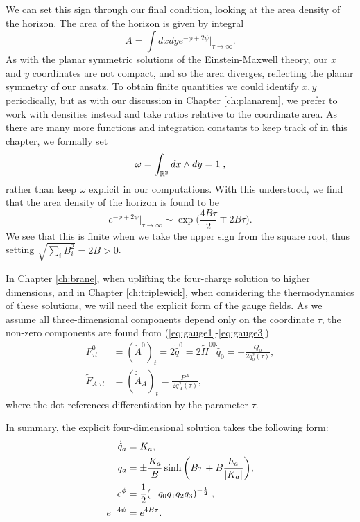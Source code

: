We can set this sign through our final condition, looking at the area density of the horizon. The area of the horizon is given by integral
\begin{equation}
A = \int dx dy e^{-\phi+2\psi}\bigg|_{\tau \rightarrow \infty}.
\end{equation}
As with the planar symmetric solutions of the Einstein-Maxwell theory, our $x$ and $y$ coordinates are not compact, and so the area diverges, reflecting the planar symmetry of our ansatz. To obtain finite quantities we could identify $x,y$ periodically, but as with our discussion in Chapter \ref{ch:planarem}, we prefer to work with densities instead and take ratios relative to the coordinate area. As there are many more functions and integration constants to keep track of in this chapter, we formally set
\begin{equation*}
	\omega = \int_{{\mathbb{R}}^2} dx \wedge dy = 1 \;,
\end{equation*}
rather than keep $\omega$ explicit in our computations. With this understood, we find that the area density of the horizon is found to be
\begin{equation}
e^{-\phi + 2\psi} \bigg|_{\tau \rightarrow \infty} \sim \exp \bigg(\frac{4B\tau}{2} \mp 2B\tau \bigg).
\end{equation}
We see that this is finite when we take the upper sign from the square root, thus setting $\sqrt{\sum_i B_i^2} = 2B > 0$. 

In Chapter \ref{ch:brane}, when uplifting the four-charge solution to higher dimensions, and in Chapter \ref{ch:triplewick}, when considering the thermodynamics of these solutions, we will need the explicit form of the gauge fields. As we assume all three-dimensional components depend only on the coordinate $\tau$, the non-zero components are found from (\ref{eq:gauge1}-\ref{eq:gauge3})
\begin{equation}
\label{eq:4dgauge}
\begin{aligned}
	 F^0_{\tau t} &= (\dot{A}^0)_{t} = 2 \dot{\hat{q}}^0 = 2 \tilde{H}^{00} \dot{\hat{q}}_0 = -\frac{Q_0}{2 q_0^2(\tau)}, \\
	  \tilde{F}_{A | \tau t} &= (\dot{\tilde{A}}_A)_{t} = \frac{P^A}{2 q_A^2(\tau)},
\end{aligned}
\end{equation}
where the dot references differentiation by the parameter $\tau$.

In summary, the explicit four-dimensional solution takes the following form:
\begin{equation}
\label{eq:4dsummary}
\begin{aligned}
\dot{\hat{q}}_a &= K_a, \\
q_a &= \pm \frac{K_a}{B} \sinh \bigg(B \tau + B \frac{h_a}{|K_a|} \bigg), \\
e^{\phi} &= \frac{1}{2} (-q_0q_1q_2q_3)^{-\frac{1}{2}} \;, \\
e^{-4\psi} &= e^{ 4B \tau} .
\end{aligned}
\end{equation}


